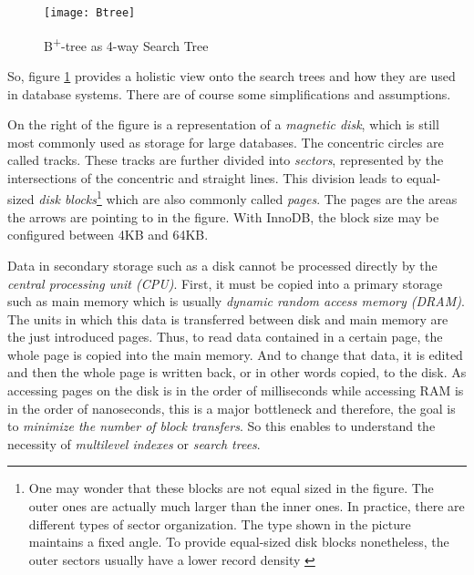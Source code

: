 \begin{figure}[H]
	\centering
	\texttt{[image: Btree]}
	\caption[B\textsuperscript{+}-tree as 4-way Search Tree]{B\textsuperscript{+}-tree as 4-way Search Tree }
	\label{fig:B+tree}
\end{figure}

So, figure \ref{fig:B+tree} provides a holistic view onto the search trees and how they are used in database systems. There are of course some simplifications and assumptions.\par 
On the right of the figure is a representation of a \emph{magnetic disk}, which is still most commonly used as storage for large databases. The concentric circles are called tracks. These tracks are further divided into \emph{sectors}, represented by the intersections of the concentric and straight lines. This division leads to equal-sized \emph{disk blocks}\footnote{One may wonder that these blocks are not equal sized in the figure. The outer ones are actually much larger than the inner ones. In practice, there are different types of sector organization. The type shown in the picture maintains a fixed angle. To provide equal-sized disk blocks nonetheless, the outer sectors usually have a lower record density \cite{DatabaseFundamentals}} which are also commonly called \emph{pages}. The pages are the areas the arrows are pointing to in the figure. With InnoDB, the block size may be configured between 4KB and 64KB.\par 
Data in secondary storage such as a disk cannot be processed directly by the \emph{central processing unit (CPU)}. First, it must be copied into a primary storage such as main memory which is usually \emph{dynamic random access memory (DRAM)}. The units in which this data is transferred between disk and main memory are the just introduced pages. Thus, to read data contained in a certain page, the whole page is copied into the main memory. And to change that data, it is edited and then the whole page is written back, or in other words copied, to the disk. As accessing pages on the disk is in the order of milliseconds while accessing RAM is in the order of nanoseconds, this is a major bottleneck and therefore, the goal is to \emph{minimize the number of block transfers}. So this enables to understand the necessity of \emph{multilevel indexes} or \emph{search trees}.\par
